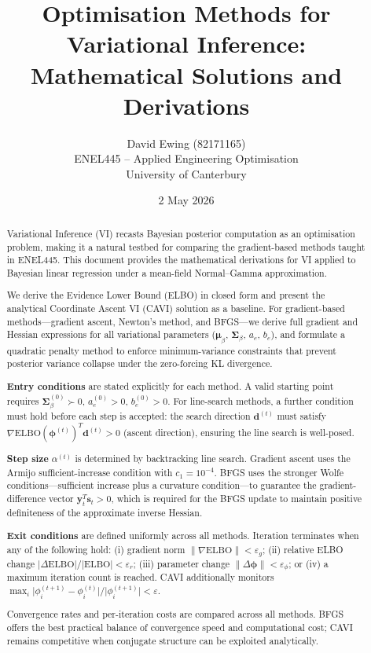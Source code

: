 \documentclass[11pt]{article}
\title{Optimisation Methods for Variational Inference:\\
Mathematical Solutions and Derivations}
\author{David Ewing (82171165)\\
ENEL445 -- Applied Engineering Optimisation\\
University of Canterbury}
\date{2 May 2026}
\newcommand{\ELBO}{\text{ELBO}}
\begin{document}
\maketitle

\begin{abstract}
Variational Inference (VI) recasts Bayesian posterior computation as an optimisation problem, making it a natural testbed for comparing the
gradient-based methods taught in ENEL445. This document provides the mathematical derivations for VI applied to Bayesian linear regression under
a mean-field Normal--Gamma approximation.

We derive the Evidence Lower Bound (ELBO) in closed form and present the
analytical Coordinate Ascent VI (CAVI) solution as a baseline. For
gradient-based methods---gradient ascent, Newton's method, and BFGS---we
derive full gradient and Hessian expressions for all variational parameters
($\bm{\mu}_\beta$, $\bm{\Sigma}_\beta$, $a_e$, $b_e$), and formulate a
quadratic penalty method to enforce minimum-variance constraints that
prevent posterior variance collapse under the zero-forcing KL divergence.

\textbf{Entry conditions} are stated explicitly for each method. A valid
starting point requires $\bm{\Sigma}_\beta^{(0)} \succ 0$,
$a_e^{(0)} > 0$, $b_e^{(0)} > 0$. For line-search methods, a further
condition must hold before each step is accepted: the search direction
$\bm{d}^{(t)}$ must satisfy $\nabla\ELBO(\bm{\phi}^{(t)})^T \bm{d}^{(t)}
> 0$ (ascent direction), ensuring the line search is well-posed.

\textbf{Step size} $\alpha^{(t)}$ is determined by backtracking line
search. Gradient ascent uses the Armijo sufficient-increase condition with
$c_1 = 10^{-4}$. BFGS uses the stronger Wolfe conditions---sufficient
increase plus a curvature condition---to guarantee the gradient-difference
vector $\bm{y}_t^T \bm{s}_t > 0$, which is required for the BFGS update
to maintain positive definiteness of the approximate inverse Hessian.

\textbf{Exit conditions} are defined uniformly across all methods.
Iteration terminates when any of the following hold: (i) gradient norm
$\lVert\nabla\ELBO\rVert < \varepsilon_g$; (ii) relative ELBO change
$\lvert\Delta\ELBO\rvert / \lvert\ELBO\rvert < \varepsilon_r$; (iii)
parameter change $\lVert\Delta\bm{\phi}\rVert < \varepsilon_\phi$; or
(iv) a maximum iteration count is reached. CAVI additionally monitors
$\max_i \lvert\phi_i^{(t+1)} - \phi_i^{(t)}\rvert /
\lvert\phi_i^{(t+1)}\rvert < \varepsilon$.

Convergence rates and per-iteration costs are compared across all methods.
BFGS offers the best practical balance of convergence speed and
computational cost; CAVI remains competitive when conjugate structure can
be exploited analytically.
\end{abstract}
\end{document}
